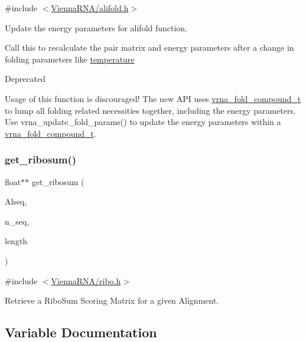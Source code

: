{\ttfamily \#include $<$\mbox{\hyperlink{alifold_8h}{Vienna\+R\+N\+A/alifold.\+h}}$>$}



Update the energy parameters for alifold function. 

Call this to recalculate the pair matrix and energy parameters after a change in folding parameters like \mbox{\hyperlink{group__model__details_gab4b11c8d9c758430960896bc3fe82ead}{temperature}}

\begin{DoxyRefDesc}{Deprecated}
\item[\mbox{\hyperlink{deprecated__deprecated000025}{Deprecated}}]Usage of this function is discouraged! The new A\+PI uses \mbox{\hyperlink{group__fold__compound_ga1b0cef17fd40466cef5968eaeeff6166}{vrna\+\_\+fold\+\_\+compound\+\_\+t}} to lump all folding related necessities together, including the energy parameters. Use vrna\+\_\+update\+\_\+fold\+\_\+params() to update the energy parameters within a \mbox{\hyperlink{group__fold__compound_ga1b0cef17fd40466cef5968eaeeff6166}{vrna\+\_\+fold\+\_\+compound\+\_\+t}}. \end{DoxyRefDesc}
\mbox{\label{group__consensus__fold_ga1116aed4b2dab5252cd23946d47d52c3}} 
\subsubsection{\texorpdfstring{get\+\_\+ribosum()}{get\_ribosum()}}
{\footnotesize\ttfamily float$\ast$$\ast$ get\+\_\+ribosum (\begin{DoxyParamCaption}\item[{const char $\ast$$\ast$}]{Alseq,  }\item[{int}]{n\+\_\+seq,  }\item[{int}]{length }\end{DoxyParamCaption})}



{\ttfamily \#include $<$\mbox{\hyperlink{ribo_8h}{Vienna\+R\+N\+A/ribo.\+h}}$>$}



Retrieve a Ribo\+Sum Scoring Matrix for a given Alignment. 



\subsection{Variable Documentation}
\mbox{\label{group__consensus__fold_gaf3cbac6ff5d706d6e414677841ddf94c}} 
